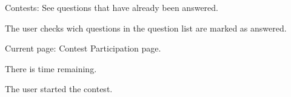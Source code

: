 \begin{uc}{Contests: See questions that have already been answered.}

    \begin{uc-mss}
    \item The user checks wich questions in the question list are marked as answered.
    \end{uc-mss}

    \begin{uc-pre}
    \item Current page: Contest Participation page.
    \item There is time remaining.
    \end{uc-pre}

    \begin{uc-trig}
    The user started the contest.
    \end{uc-trig}

\end{uc}